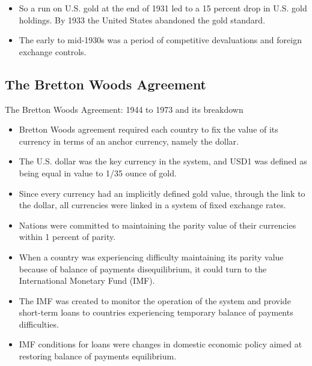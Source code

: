 \documentclass[international_finance_p1.tex]{subfiles}
\begin{document}
\begin{frame}{}
\begin{itemize}[<+->]
\item
So a run on U.S. gold at the end of 1931 led to a 15 percent drop in U.S. gold holdings. By 1933 the United States abandoned the gold standard.
\item
The early to mid-1930s was a period of competitive devaluations and foreign exchange controls.
\end{itemize}
\end{frame}
\subsection{The Bretton Woods Agreement}
\begin{frame}{The Bretton Woods Agreement: 1944 to 1973 and its breakdown}
\begin{itemize}[<+->]
\item
Bretton Woods agreement required each country to fix the value of its currency in terms of an anchor currency, namely the dollar. 
\item
The U.S. dollar was the key currency in the system, and USD1 was defined as being equal in value to 1/35 ounce of gold. 
\item
Since every currency had an implicitly defined gold value, through the link to the dollar, all currencies were linked in a system of fixed exchange rates.
\end{itemize}
\end{frame}
\begin{frame}{}
\begin{itemize}[<+->]
\item
Nations were committed to maintaining the parity value of their currencies within 1 percent of parity. 
\item
When a country was experiencing difficulty maintaining its parity value because of balance of payments disequilibrium, it could turn to the International Monetary Fund (IMF).
\end{itemize}
\end{frame}
\begin{frame}{}
\begin{itemize}[<+->]
\item
The IMF was created to monitor the operation of the system and provide short-term loans to countries experiencing temporary balance of payments difficulties. 
\item
IMF conditions for loans were changes in domestic economic policy aimed at restoring balance of payments equilibrium.
\end{itemize}
\end{frame}
\end{document}
